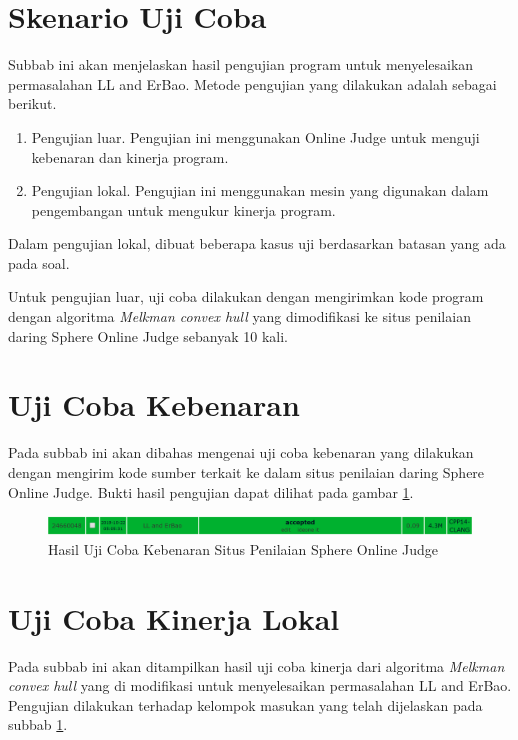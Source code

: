 \section{Skenario Uji Coba}
\label{sec:skenario-uji-coba}
Subbab ini akan menjelaskan hasil pengujian program untuk menyelesaikan permasalahan LL and ErBao. Metode pengujian yang dilakukan adalah sebagai berikut.
\begin{enumerate}
	\item Pengujian luar. Pengujian ini menggunakan Online Judge untuk menguji kebenaran dan kinerja program.
	\item Pengujian lokal. Pengujian ini menggunakan mesin yang digunakan dalam pengembangan untuk mengukur kinerja program.
\end{enumerate}
Dalam pengujian lokal, dibuat beberapa kasus uji berdasarkan batasan yang ada pada soal.
\par Untuk pengujian luar, uji coba dilakukan dengan mengirimkan kode program dengan algoritma \textit{Melkman convex hull} yang dimodifikasi ke situs penilaian daring Sphere Online Judge sebanyak 10 kali.

\section{Uji Coba Kebenaran}
Pada subbab ini akan dibahas mengenai uji coba kebenaran yang dilakukan dengan mengirim kode sumber terkait ke dalam situs penilaian daring Sphere Online Judge. Bukti hasil pengujian dapat dilihat pada gambar \ref{fig:hasil-uji-coba-kebenaran-situs-penilaian-spoj}.
\begin{figure}[!h]
	\Centering
	\includegraphics [width=\columnwidth]{bab5/img/hasil-uji-coba-kebenaran-situs-penilaian-spoj}
	\caption {Hasil Uji Coba Kebenaran Situs Penilaian Sphere Online Judge}
	\label {fig:hasil-uji-coba-kebenaran-situs-penilaian-spoj}
\end{figure}

\section{Uji Coba Kinerja Lokal}
Pada subbab ini akan ditampilkan hasil uji coba kinerja dari algoritma \textit{Melkman convex hull} yang di modifikasi untuk menyelesaikan permasalahan LL and ErBao. Pengujian dilakukan terhadap kelompok masukan yang telah dijelaskan pada subbab \ref{sec:skenario-uji-coba}.

